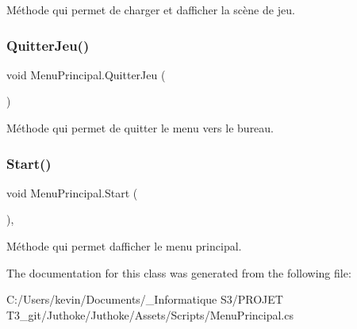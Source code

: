 Méthode qui permet de charger et d\textquotesingle{}afficher la scène de jeu. \mbox{\label{class_menu_principal_aeac0d5acdbe491c5f4908cda0be06e01}} 
\subsubsection{\texorpdfstring{Quitter\+Jeu()}{QuitterJeu()}}
{\footnotesize\ttfamily void Menu\+Principal.\+Quitter\+Jeu (\begin{DoxyParamCaption}{ }\end{DoxyParamCaption})\hspace{0.3cm}{\ttfamily [inline]}}

Méthode qui permet de quitter le menu vers le bureau. \mbox{\label{class_menu_principal_a00be0527421c80f5386b0d34f1fff1e3}} 
\subsubsection{\texorpdfstring{Start()}{Start()}}
{\footnotesize\ttfamily void Menu\+Principal.\+Start (\begin{DoxyParamCaption}{ }\end{DoxyParamCaption})\hspace{0.3cm}{\ttfamily [inline]}, {\ttfamily [private]}}

Méthode qui permet d\textquotesingle{}afficher le menu principal. 

The documentation for this class was generated from the following file\+:\begin{DoxyCompactItemize}
\item 
C\+:/\+Users/kevin/\+Documents/\+\_\+\+Informatique S3/\+P\+R\+O\+J\+E\+T T3\+\_\+git/\+Juthoke/\+Juthoke/\+Assets/\+Scripts/Menu\+Principal.\+cs\end{DoxyCompactItemize}
